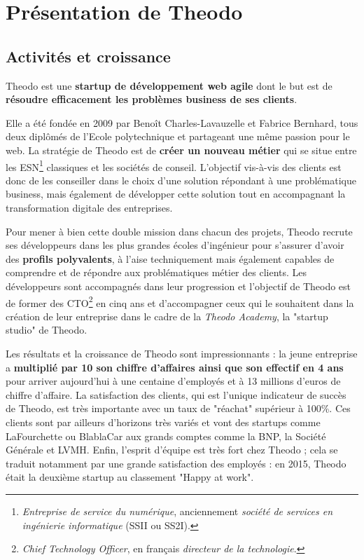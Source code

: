 \section{Présentation de Theodo}

\subsection{Activités et croissance}

Theodo est une \textbf{startup de développement web agile} dont le but est de \textbf{résoudre efficacement les problèmes \foreignlanguage{english}{business} de ses clients}.

Elle a été fondée en 2009 par Benoît Charles-Lavauzelle et Fabrice Bernhard, tous deux diplômés de l'Ecole polytechnique et partageant une même passion pour le web. La stratégie de Theodo est de \textbf{créer un nouveau métier} qui se situe entre les ESN\footnote{\textit{Entreprise de service du numérique}, anciennement \textit{société de services en ingénierie informatique} (SSII ou SS2I).} classiques et les sociétés de conseil. L'objectif vis-à-vis des clients est donc de les conseiller dans le choix d'une solution répondant à une problématique business, mais également de développer cette solution tout en accompagnant la transformation digitale des entreprises.

Pour mener à bien cette double mission dans chacun des projets, Theodo recrute ses développeurs dans les plus grandes écoles d'ingénieur pour s'assurer d'avoir des \textbf{profils polyvalents}, à l'aise techniquement mais également capables de comprendre et de répondre aux problématiques métier des clients. Les développeurs sont accompagnés dans leur progression et l'objectif de Theodo est de former des CTO\footnote{\textit{\foreignlanguage{english}{Chief Technology Officer}}, en français \textit{directeur de la technologie}.} en cinq ans et d'accompagner ceux qui le souhaitent dans la création de leur entreprise dans le cadre de la \textit{\foreignlanguage{english}{Theodo Academy}}, la "startup studio" de Theodo.

Les résultats et la croissance de Theodo sont impressionnants : la jeune entreprise a \textbf{multiplié par 10 son chiffre d'affaires ainsi que son effectif en 4 ans} pour arriver aujourd'hui à une centaine d'employés et à 13 millions d'euros de chiffre d'affaire. La satisfaction des clients, qui est l'unique indicateur de succès de Theodo, est très importante avec un taux de "réachat" supérieur à 100\%. Ces clients sont par ailleurs d'horizons très variés et vont des startups comme LaFourchette ou BlablaCar aux grands comptes comme la BNP, la Société Générale et LVMH. Enfin, l'esprit d'équipe est très fort chez Theodo ; cela se traduit notamment par une grande satisfaction des employés : en 2015, Theodo était la deuxième startup au classement "Happy at work".

